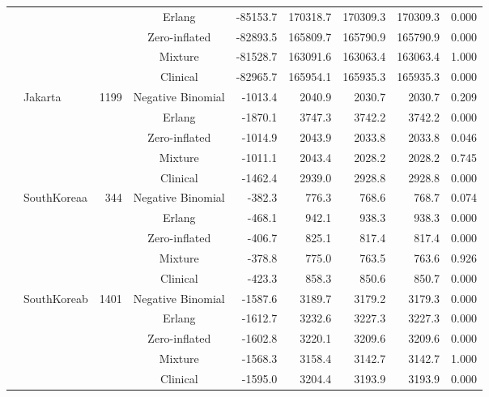 \begin{table}[ht]
\begin{tabular}{llrcrrrrr}
   &  &  & Erlang & -85153.7 & 170318.7 & 170309.3 & 170309.3 & 0.000 \\ 
   &  &  & Zero-inflated & -82893.5 & 165809.7 & 165790.9 & 165790.9 & 0.000 \\ 
   &  &  & Mixture & -81528.7 & 163091.6 & 163063.4 & 163063.4 & 1.000 \\ 
   &  &  & Clinical & -82965.7 & 165954.1 & 165935.3 & 165935.3 & 0.000 \\ 
   & Jakarta & 1199 & Negative Binomial & -1013.4 & 2040.9 & 2030.7 & 2030.7 & 0.209 \\ 
   &  &  & Erlang & -1870.1 & 3747.3 & 3742.2 & 3742.2 & 0.000 \\ 
   &  &  & Zero-inflated & -1014.9 & 2043.9 & 2033.8 & 2033.8 & 0.046 \\ 
   &  &  & Mixture & -1011.1 & 2043.4 & 2028.2 & 2028.2 & 0.745 \\ 
   &  &  & Clinical & -1462.4 & 2939.0 & 2928.8 & 2928.8 & 0.000 \\ 
   & SouthKoreaa & 344 & Negative Binomial & -382.3 & 776.3 & 768.6 & 768.7 & 0.074 \\ 
   &  &  & Erlang & -468.1 & 942.1 & 938.3 & 938.3 & 0.000 \\ 
   &  &  & Zero-inflated & -406.7 & 825.1 & 817.4 & 817.4 & 0.000 \\ 
   &  &  & Mixture & -378.8 & 775.0 & 763.5 & 763.6 & 0.926 \\ 
   &  &  & Clinical & -423.3 & 858.3 & 850.6 & 850.7 & 0.000 \\ 
   & SouthKoreab & 1401 & Negative Binomial & -1587.6 & 3189.7 & 3179.2 & 3179.3 & 0.000 \\ 
   &  &  & Erlang & -1612.7 & 3232.6 & 3227.3 & 3227.3 & 0.000 \\ 
   &  &  & Zero-inflated & -1602.8 & 3220.1 & 3209.6 & 3209.6 & 0.000 \\ 
   &  &  & Mixture & -1568.3 & 3158.4 & 3142.7 & 3142.7 & 1.000 \\ 
   &  &  & Clinical & -1595.0 & 3204.4 & 3193.9 & 3193.9 & 0.000 \\ 
   \hline
\end{tabular}
\end{table}
